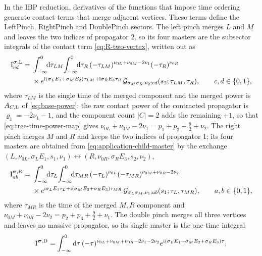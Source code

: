 \documentclass[11pt,a4paper]{article}
\numberwithin{table}{section}
\newcommand{\dd}{\mathrm d}
\newcommand{\ii}{\mathrm i}
\begin{document}
In the IBP reduction, derivatives of the functions that impose time ordering generate
contact terms that merge adjacent vertices. These terms define the
LeftPinch, RightPinch and DoublePinch sectors.
The left pinch merges $L$ and $M$ and leaves the two indices of propagator 2, so its four masters
are the subsector integrals of the contact term \eqref{eq:R-two-vertex}, written out as
\begin{equation}
 \begin{aligned}
 \text{I}^{\boldsymbol\sigma,{\rm L}}_{cd}
 ={}&\int_{-\infty}^{0}\!\!\dd\tau_{LM}\!\int_{-\infty}^{0}\!\!\dd\tau_R\,
 (-\tau_{LM})^{\nu_{0L}+\nu_{0M}-2\nu_1}(-\tau_R)^{\nu_{0R}}\\
 &\times e^{\ii(\sigma_LE_1+\sigma_ME_2)\tau_{LM}+\ii\sigma_RE_3\tau_R}\,
 \mathcal G_{\sigma_M\sigma_R,\nu_2;cd}(s_2;\tau_{LM},\tau_R),
 \qquad c,d\in\{0,1\},
 \end{aligned}
 \label{eq:application-child-master}
\end{equation}
where $\tau_{LM}$ is the single time of the merged component and the merged power is
$A_{C,{\rm L}}$ of \eqref{eq:base-power}: the raw contact power of the contracted propagator is
$\varrho_1=-2\nu_1-1$, and the component count $|C|=2$ adds the remaining $+1$, so
that \eqref{eq:tree-time-power-map} gives $\nu_{0L}+\nu_{0M}-2\nu_1=p_1+p_2+\tfrac92+\nu_2$.
The right pinch merges $M$ and $R$ and keeps the two indices of propagator 1; its four masters
are obtained from \eqref{eq:application-child-master} by the exchange
$(L,\nu_{0L},\sigma_LE_1,s_1,\nu_1)\leftrightarrow(R,\nu_{0R},\sigma_RE_3,s_2,\nu_2)$,
\begin{equation}
 \begin{aligned}
 \text{I}^{\boldsymbol\sigma,{\rm R}}_{ab}
 ={}&\int_{-\infty}^{0}\!\!\dd\tau_L\!\int_{-\infty}^{0}\!\!\dd\tau_{MR}\,
 (-\tau_L)^{\nu_{0L}}(-\tau_{MR})^{\nu_{0M}+\nu_{0R}-2\nu_2}\\
 &\times e^{\ii\sigma_LE_1\tau_L+\ii(\sigma_ME_2+\sigma_RE_3)\tau_{MR}}\,
 \mathcal G_{\sigma_L\sigma_M,\nu_1;ab}(s_1;\tau_L,\tau_{MR}),
 \qquad a,b\in\{0,1\},
 \end{aligned}
 \label{eq:application-right-master}
\end{equation}
where $\tau_{MR}$ is the time of the merged $M,R$ component and
$\nu_{0M}+\nu_{0R}-2\nu_2=p_2+p_3+\tfrac92+\nu_1$.
The double pinch merges all three vertices and leaves no massive propagator, so its single
master is the one-time integral
\begin{equation}
 \text{I}^{\boldsymbol\sigma,{\rm D}}
 =\int_{-\infty}^{0}\dd\tau\,
 (-\tau)^{\nu_{0L}+\nu_{0M}+\nu_{0R}-2\nu_1-2\nu_2}
 e^{\ii(\sigma_LE_1+\sigma_ME_2+\sigma_RE_3)\tau},
 \label{eq:application-double-master}
\end{equation}
\end{document}
